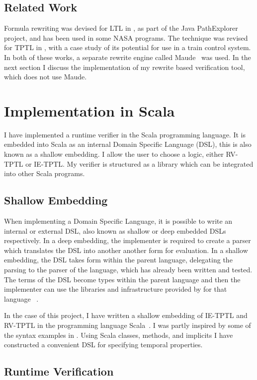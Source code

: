 \documentclass[a4paper]{article}
\begin{document}
\subsection{Related Work}
Formula rewriting was devised for LTL in \textcite{rosu2005rewriting}, as part of the Java PathExplorer project, and has been used in some NASA programs. The technique was revised for TPTL in \textcite{chai2013rewriting}, with a case study of its potential for use in a train control system. In both of these works, a separate rewrite engine called Maude~\autocite{clavel2002maude} was used. In the next section I discuss the implementation of my rewrite based verification tool, which does not use Maude.

\section{Implementation in Scala}\label{implementaion}
I have implemented a runtime verifier in the Scala programming language.
It is embedded into Scala as an internal Domain Specific Language (DSL), this is also known as a shallow embedding.
I allow the user to choose a logic, either RV-TPTL or IE-TPTL.
My verifier is structured as a library which can be integrated into other Scala programs.

\subsection{Shallow Embedding}
When implementing a Domain Specific Language, it is possible to write an internal or external DSL, also known as shallow or deep embedded DSLs respectively. In a deep embedding, the implementer is required to create a parser which translates the DSL into another another form for evaluation. In a shallow embedding, the DSL takes form within the parent language, delegating the parsing to the parser of the language, which has already been written and tested. The terms of the DSL become types within the parent language and then the implementer can use the libraries and infrastructure provided by for that language~
\autocite{gibbons2014foldingdeepshallow}.

In the case of this project, I have written a shallow embedding of IE-TPTL and RV-TPTL in the programming language Scala~\autocite{Odersky04scala}. I was partly inspired by some of the syntax examples in \textcite{barringer2011tracecontract}. Using Scala classes, methods, and implicits I have constructed a convenient DSL for specifying temporal properties.
\subsection{Runtime Verification}
\end{document}

